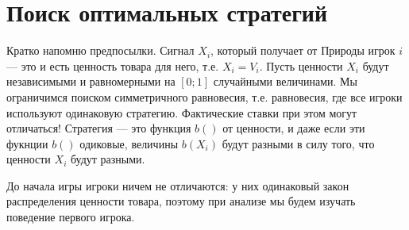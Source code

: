 \section{Поиск оптимальных стратегий}

Кратко напомню предпосылки. Сигнал $ X_{i} $, который получает от Природы игрок $ i $ --- это и есть ценность товара для него, т.е. $ X_{i}=V_{i} $. Пусть ценности $ X_{i} $ будут независимыми и равномерными на $ [0;1] $ случайными величинами. Мы ограничимся поиском симметричного равновесия, т.е. равновесия, где все игроки используют одинаковую стратегию. Фактические ставки при этом могут отличаться! Стратегия --- это функция $b()$ от ценности, и даже если эти фукнции $ b() $ одиковые, величины $ b(X_{i}) $ будут разными в силу того, что ценности $ X_{i} $ будут разными.


До начала игры игроки ничем не отличаются: у них одинаковый закон распределения ценности товара, поэтому при анализе мы будем изучать поведение первого игрока. 

